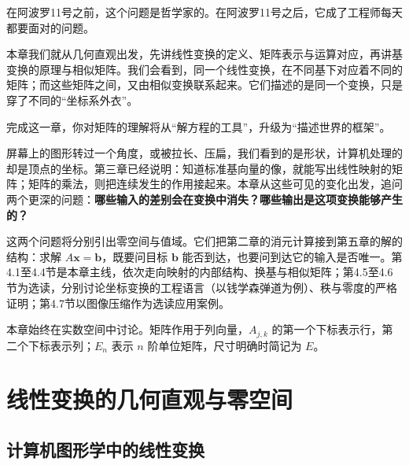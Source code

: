 \documentclass[a4paper,12pt,twoside,openany,fontset=none]{ctexbook}
\numberwithin{equation}{chapter}
\begin{document}
在阿波罗11号之前，这个问题是哲学家的。在阿波罗11号之后，它成了工程师每天都要面对的问题。

本章我们就从几何直观出发，先讲线性变换的定义、矩阵表示与运算对应，再讲基变换的原理与相似矩阵。我们会看到，同一个线性变换，在不同基下对应着不同的矩阵；而这些矩阵之间，又由相似变换联系起来。它们描述的是同一个变换，只是穿了不同的“坐标系外衣”。

完成这一章，你对矩阵的理解将从“解方程的工具”，升级为“描述世界的框架”。

\par\clearpage
\endgroup

\setcounter{figure}{0}


屏幕上的图形转过一个角度，或被拉长、压扁，我们看到的是形状，计算机处理的却是顶点的坐标。第三章已经说明：知道标准基向量的像，就能写出线性映射的矩阵；矩阵的乘法，则把连续发生的作用接起来。本章从这些可见的变化出发，追问两个更深的问题：\textbf{哪些输入的差别会在变换中消失？哪些输出是这项变换能够产生的？}

这两个问题将分别引出零空间与值域。它们把第二章的消元计算接到第五章的解的结构：求解 $A\boldsymbol x=\boldsymbol b$，既要问目标 $\boldsymbol b$ 能否到达，也要问到达它的输入是否唯一。第4.1至4.4节是本章主线，依次走向映射的内部结构、换基与相似矩阵；第4.5至4.6节为选读，分别讨论坐标变换的工程语言（以钱学森弹道为例）、秩与零度的严格证明；第4.7节以图像压缩作为选读应用案例。

本章始终在实数空间中讨论。矩阵作用于列向量，$A_{j,k}$ 的第一个下标表示行，第二个下标表示列；$E_n$ 表示 $n$ 阶单位矩阵，尺寸明确时简记为 $E$。

\section{线性变换的几何直观与零空间}
\label{sec:four-geometry-null}
\subsection{计算机图形学中的线性变换}
\label{sec:four-graphics}
\end{document}
